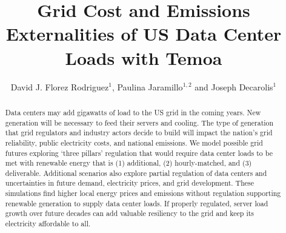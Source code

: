 \documentclass{iopjournal}
\begin{document}

\title{Grid Cost and Emissions Externalities of US Data Center Loads with Temoa}

\author{David J. Florez Rodriguez$^{1}$, Paulina Jaramillo$^{1,2}$ and Joseph Decarolis$^{1}$}






\begin{abstract}
Data centers may add gigawatts of load to the US grid in the coming years. New generation will be necessary to feed their servers and cooling. The type of generation that grid regulators and industry actors decide to build will impact the nation's grid reliability, public electricity costs, and national emissions. We model possible grid futures exploring `three pillars' regulation that would require data center loads to be met with renewable energy that is (1) additional, (2) hourly-matched, and (3) deliverable. Additional scenarios also explore partial regulation of data centers and uncertainties in future demand, electricity prices, and grid development. These simulations find higher local energy prices and emissions without regulation supporting renewable generation to supply data center loads. If properly regulated, server load growth over future decades can add valuable resiliency to the grid and keep its electricity affordable to all. 
\end{abstract}
\end{document}
